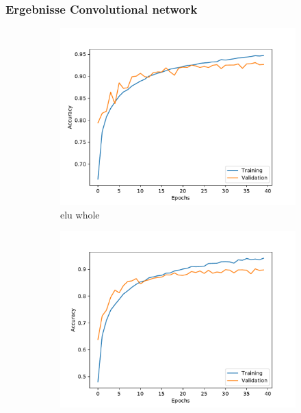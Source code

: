 \documentclass[aspectratio=1610, professionalfonts, 9pt]{beamer}
\begin{document}
{
    

}
\begin{frame}
    \frametitle{Ergebnisse Convolutional network}
    \begin{figure}[H]%
        \begin{subfigure}{0.3\textwidth}%
            \includegraphics[width=1.2\linewidth]{images/accuracy_history_elu.pdf}%
            \caption{elu whole}%
        \end{subfigure}%
        \hfill%
        \begin{subfigure}{0.3\textwidth}%
            \includegraphics[width=1.2\linewidth]{images/accuracy_history_equal.pdf}%

\end{subfigure}
\end{figure}
\end{frame}
\end{document}
